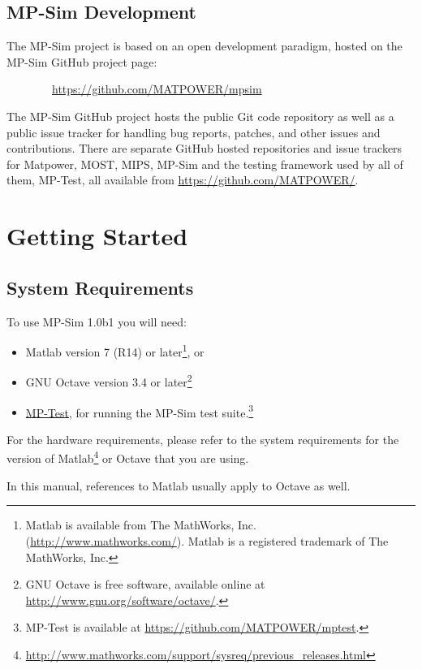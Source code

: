 \documentclass[12pt]{article}
\newcommand{\matlab}[0]{{\sc Matlab}}
\newcommand{\matpower}[0]{{\sc Matpower}}
\newcommand{\mptest}[0]{{MP-Test}}
\newcommand{\mptesturl}[0]{https://github.com/MATPOWER/mptest}
\newcommand{\mptestlink}[0]{\href{\mptesturl}{\mptest{}}}
\newcommand{\mips}[0]{{MIPS}}
\newcommand{\mpsim}[0]{{MP-Sim}}
\newcommand{\mpsimver}[0]{1.0b1}
\newcommand{\mpsimurl}[0]{https://github.com/MATPOWER/mpsim}
\newcommand{\most}[0]{{MOST}}
\numberwithin{equation}{section}
\numberwithin{table}{section}
\numberwithin{figure}{section}
\begin{document}
\subsection{\mpsim{} Development}
\label{sec:development}

The \mpsim{} project is based on an open development paradigm, hosted on the \mpsim{} GitHub project page:

\bigskip

~~~~~~~~\url{\mpsimurl}

\bigskip

The \mpsim{} GitHub project hosts the public Git code repository as well as a public issue tracker for handling bug reports, patches, and other issues and contributions. There are separate GitHub hosted repositories and issue trackers for \matpower{}, \most{}, \mips{}, \mpsim{} and the testing framework used by all of them, \mptest{}, all available from \url{https://github.com/MATPOWER/}.


\section{Getting Started}

\subsection{System Requirements}
\label{sec:sysreq}
To use \mpsim{} \mpsimver{} you will need:
\begin{itemize}
\item \matlab{}\textsuperscript{\tiny \textregistered} version 7 (R14) or later\footnote{\matlab{} is available from The MathWorks, Inc. (\url{http://www.mathworks.com/}). \matlab{} is a registered trademark of The MathWorks, Inc.}, or
\item GNU Octave version 3.4 or later\footnote{GNU Octave \cite{octave} is free software, available online at \url{http://www.gnu.org/software/octave/}.}
\item \mptestlink{}, for running the \mpsim{} test suite.\footnote{\mptest{} is available at \url{\mptesturl}.}
\end{itemize}

For the hardware requirements, please refer to the system requirements for the version of \matlab{}\footnote{\url{http://www.mathworks.com/support/sysreq/previous_releases.html}} or Octave that you are using.

In this manual, references to \matlab{} usually apply to Octave as well.
\end{document}
